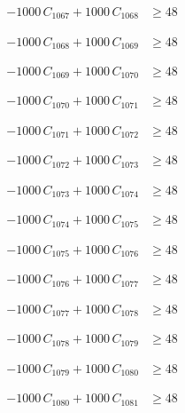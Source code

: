 \documentclass[a4paper,11pt]{article}
\begin{document}
\begin{align}
-1000\,C_{1067} + 1000\,C_{1068} &\geq 48 \nonumber
\end{align}

\begin{align}
-1000\,C_{1068} + 1000\,C_{1069} &\geq 48 \nonumber
\end{align}

\begin{align}
-1000\,C_{1069} + 1000\,C_{1070} &\geq 48 \nonumber
\end{align}

\begin{align}
-1000\,C_{1070} + 1000\,C_{1071} &\geq 48 \nonumber
\end{align}

\begin{align}
-1000\,C_{1071} + 1000\,C_{1072} &\geq 48 \nonumber
\end{align}

\begin{align}
-1000\,C_{1072} + 1000\,C_{1073} &\geq 48 \nonumber
\end{align}

\begin{align}
-1000\,C_{1073} + 1000\,C_{1074} &\geq 48 \nonumber
\end{align}

\begin{align}
-1000\,C_{1074} + 1000\,C_{1075} &\geq 48 \nonumber
\end{align}

\begin{align}
-1000\,C_{1075} + 1000\,C_{1076} &\geq 48 \nonumber
\end{align}

\begin{align}
-1000\,C_{1076} + 1000\,C_{1077} &\geq 48 \nonumber
\end{align}

\begin{align}
-1000\,C_{1077} + 1000\,C_{1078} &\geq 48 \nonumber
\end{align}

\begin{align}
-1000\,C_{1078} + 1000\,C_{1079} &\geq 48 \nonumber
\end{align}

\begin{align}
-1000\,C_{1079} + 1000\,C_{1080} &\geq 48 \nonumber
\end{align}

\begin{align}
-1000\,C_{1080} + 1000\,C_{1081} &\geq 48 \nonumber
\end{align}
\end{document}
